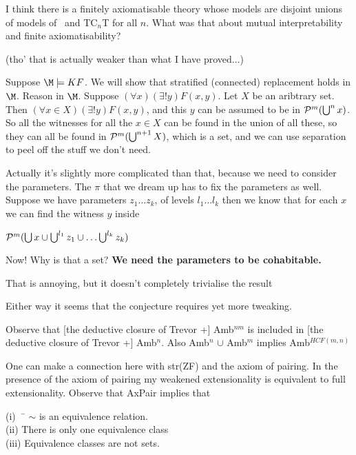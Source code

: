 \documentclass[12pt]{article}
\begin{document}
{I think there is a finitely axiomatisable theory whose models are
disjoint unions of models of \TZT\ and TC$_n$T for all $n$.  What was
that about mutual interpretability and finite axiomatisability?



(tho' that is actually weaker than what I have proved...)

\Proof

Suppose $\M \models KF$. We will show that stratified (connected)
replacement holds in $\M$.  Reason in $\M$. Suppose
$(\forall x)(\exists!y)F(x,y)$.  Let $X$ be an aribtrary set.  Then
$(\forall x\in X)(\exists!y)F(x,y)$, and this $y$ can be assumed to be
in ${\cal P}^m(\bigcup^n x)$.  So all the witnesses for all the
$x \in X$ can be found in the union of all these, so they can all be
found in ${\cal P}^m(\bigcup^{n+1} X)$, which is a set, and we can use
separation to peel off the stuff we don't need. \endproof


Actually it's slightly more complicated than that, because we need to
consider the parameters.  The $\pi$ that we dream up has to fix the
parameters as well.   Suppose we have parameters $z_1 \ldots z_k$, of
levels $l_1 \ldots l_k$ then we know that for each $x$ we can find the
witness $y$ inside
\begin{center}
  ${\cal P}^m(\bigcup x \cup \bigcup^{l_1} z_1 \cup \ldots \bigcup^{l_k} z_k)
  $\end{center}

Now!   Why is that a set?   {\bf We need the parameters to be cohabitable.}

That is annoying, but it doesn't completely trivialise the result




Either way it seems that the conjecture requires yet more tweaking.
\bigskip

Observe that [the deductive closure of Trevor +] Amb$^{nm}$ is
included in [the deductive closure of Trevor +] Amb$^n$.  Also 
Amb$^n$ $\cup$ Amb$^m$ implies Amb$^{HCF(m,n)}$

\bigskip

\bigskip

One can make a connection here with str(ZF) and the axiom of pairing.
In the presence of the axiom of pairing my weakened extensionality is
equivalent to full extensionality.  Observe that AxPair implies that 
\begin{tabbing}
(i)\ \ \= $\sim$ is an equivalence relation.  \\
(ii) \>There is only one equivalence class\\
(iii) \>Equivalence classes are not sets.
\end{tabbing}

}
\end{document}
